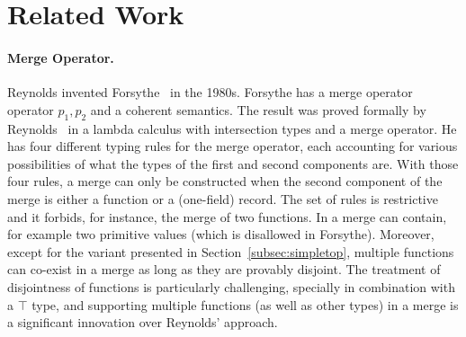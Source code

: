 \section{Related Work}
\label{sec:related-work}

\paragraph{Merge Operator.}
Reynolds invented Forsythe~\cite{reynolds1997design} in the
1980s. Forsythe has a merge operator operator $p_1, p_2 $ and a
coherent semantics. The result was proved formally by
Reynolds~\cite{reynolds1991coherence} in a lambda calculus with
intersection types and a merge operator. He has four different typing
rules for the merge operator, each accounting for various
possibilities of what the types of the first and second components
are. With those four rules, a merge can only be constructed when the
second component of the merge is either a function or a (one-field)
record. The set of rules is restrictive and it forbids, for instance,
the merge of two functions. In \name a merge can contain, 
for example two primitive values (which is disallowed in Forsythe). 
Moreover, except for the variant presented in Section~\ref{subsec:simpletop}, multiple 
functions can co-exist in a merge as long as they are provably disjoint.
The treatment of disjointness of functions is particularly
challenging, specially in combination with a $\top$ type, and
supporting multiple functions (as well as other types) in a merge is 
a significant innovation over Reynolds' approach. 

